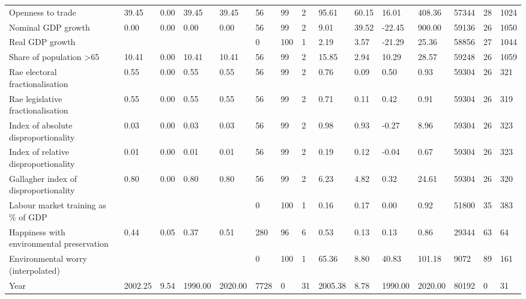 \begin{longtable}{lllllllllllllll}
Openness to trade & 39.45 & 0.00 & 39.45 & 39.45 & 56 & 99 & 2 & 95.61 & 60.15 & 16.01 & 408.36 & 57344 & 28 & 1024\\
Nominal GDP growth & 0.00 & 0.00 & 0.00 & 0.00 & 56 & 99 & 2 & 9.01 & 39.52 & -22.45 & 900.00 & 59136 & 26 & 1050\\
Real GDP growth &  &  &  &  & 0 & 100 & 1 & 2.19 & 3.57 & -21.29 & 25.36 & 58856 & 27 & 1044\\
Share of population >65 & 10.41 & 0.00 & 10.41 & 10.41 & 56 & 99 & 2 & 15.85 & 2.94 & 10.29 & 28.57 & 59248 & 26 & 1059\\
\addlinespace
Rae electoral fractionalisation & 0.55 & 0.00 & 0.55 & 0.55 & 56 & 99 & 2 & 0.76 & 0.09 & 0.50 & 0.93 & 59304 & 26 & 321\\
Rae legislative fractionalisation & 0.55 & 0.00 & 0.55 & 0.55 & 56 & 99 & 2 & 0.71 & 0.11 & 0.42 & 0.91 & 59304 & 26 & 319\\
Index of absolute disproportionality & 0.03 & 0.00 & 0.03 & 0.03 & 56 & 99 & 2 & 0.98 & 0.93 & -0.27 & 8.96 & 59304 & 26 & 323\\
Index of relative disproportionality & 0.01 & 0.00 & 0.01 & 0.01 & 56 & 99 & 2 & 0.19 & 0.12 & -0.04 & 0.67 & 59304 & 26 & 323\\
Gallagher index of disproportionality & 0.80 & 0.00 & 0.80 & 0.80 & 56 & 99 & 2 & 6.23 & 4.82 & 0.32 & 24.61 & 59304 & 26 & 320\\
\addlinespace
Labour market training as \% of GDP &  &  &  &  & 0 & 100 & 1 & 0.16 & 0.17 & 0.00 & 0.92 & 51800 & 35 & 383\\
Happiness with environmental preservation & 0.44 & 0.05 & 0.37 & 0.51 & 280 & 96 & 6 & 0.53 & 0.13 & 0.13 & 0.86 & 29344 & 63 & 64\\
Environmental worry (interpolated) &  &  &  &  & 0 & 100 & 1 & 65.36 & 8.80 & 40.83 & 101.18 & 9072 & 89 & 161\\
Year & 2002.25 & 9.54 & 1990.00 & 2020.00 & 7728 & 0 & 31 & 2005.38 & 8.78 & 1990.00 & 2020.00 & 80192 & 0 & 31\\
\bottomrule
\end{longtable}
